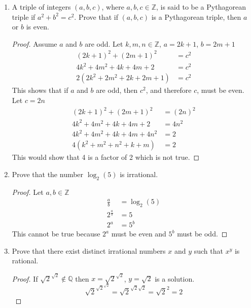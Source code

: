 \documentclass[12pt,a4paper,reqno,parskip=full]{amsart}
\numberwithin{equation}{section}
\theoremstyle{plain}
\theoremstyle{definition}
\begin{document}
\begin{enumerate}
  \item A triple of integers $(a,b,c)$, where $a,b,c\in\mathbb{Z}$, is said to be a Pythagorean triple if $a^2+b^2=c^2$. Prove that if $(a,b,c)$ is a Pythagorean triple, then $a$ or $b$ is even.
        \begin{proof}
          Assume $a$ and $b$ are odd. Let $k,m,n\in\mathbb{Z}$, $a = 2k + 1$, $b = 2m + 1$
          \begin{align*}
            (2k + 1)^2 + (2m + 1)^2      & = c^2 \\
            4k^2 + 4m^2 + 4k + 4m + 2    & = c^2 \\
            2(2k^2 + 2m^2 + 2k + 2m + 1) & = c^2
          \end{align*}
          This shows that if $a$ and $b$ are odd, then $c^2$, and therefore $c$, must be even. Let $c = 2n$
          \begin{align*}
            (2k + 1)^2 + (2m + 1)^2    & = (2n)^2 \\
            4k^2 + 4m^2 + 4k + 4m + 2  & = 4n^2     \\
            4k^2 + 4m^2 + 4k + 4m + 4n^2 & = 2      \\
            4(k^2 + m^2 + n^2 + k + m)   & = 2
          \end{align*}
          This would show that 4 is a factor of 2 which is not true.
        \end{proof}

  \item Prove that the number $\log_2(5)$ is irrational.
        \begin{proof}
          Let $a,b\in\mathbb{Z}$
          \begin{align*}
            \frac{a}{b}     & =\log_2(5) \\
            2^{\frac{a}{b}} & = 5        \\
            2^a             & = 5^b
          \end{align*}
          This cannot be true because $2^a$ must be even and $5^b$ must be odd.
        \end{proof}

  \item Prove that there exist distinct irrational numbers $x$ and $y$ such that $x^y$ is rational.
        \begin{proof}
          If $\sqrt{2}^{\sqrt{2}}\notin\mathbb{Q}$ then $x = \sqrt{2}^{\sqrt{2}}$, $y = \sqrt{2}$ is a solution.
          \[
            \sqrt{2}^{\sqrt{2}^{\sqrt{2}}} = \sqrt{2}^{\sqrt{2}\sqrt{2}} = \sqrt{2}^2 = 2
          \]


\end{proof}
\end{enumerate}
\end{document}
